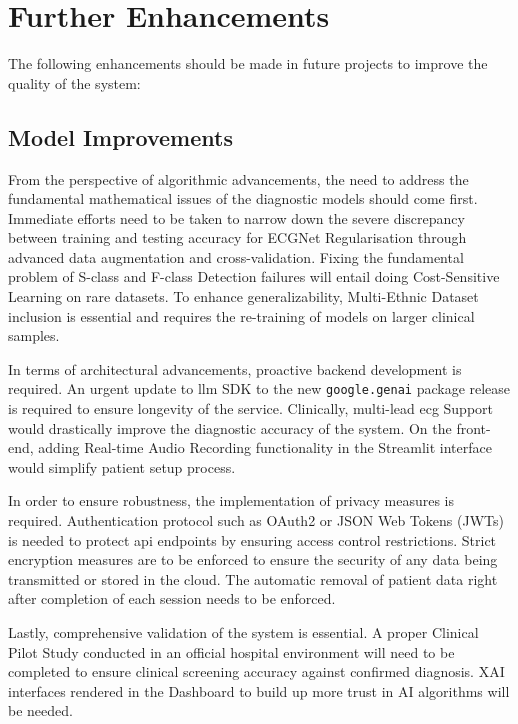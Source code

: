 \section{Further Enhancements}

The following enhancements should be made in future projects to improve the quality of the system:

\subsection{Model Improvements}

From the perspective of algorithmic advancements, the need to address the fundamental mathematical issues of the diagnostic models should come first. Immediate efforts need to be taken to narrow down the severe discrepancy between training and testing accuracy for ECGNet Regularisation through advanced data augmentation and cross-validation. Fixing the fundamental problem of S-class and F-class Detection failures will entail doing Cost-Sensitive Learning on rare datasets. To enhance generalizability, Multi-Ethnic Dataset inclusion is essential and requires the re-training of models on larger clinical samples.

In terms of architectural advancements, proactive backend development is required. An urgent update to \ac{llm} SDK to the new \texttt{google.genai} package release is required to ensure longevity of the service. Clinically, multi-lead \ac{ecg} Support would drastically improve the diagnostic accuracy of the system. On the front-end, adding Real-time Audio Recording functionality in the Streamlit interface would simplify patient setup process.

In order to ensure robustness, the implementation of privacy measures is required. Authentication protocol such as OAuth2 or JSON Web Tokens (JWTs) is needed to protect \ac{api} endpoints by ensuring access control restrictions. Strict encryption measures are to be enforced to ensure the security of any data being transmitted or stored in the cloud. The automatic removal of patient data right after completion of each session needs to be enforced.

Lastly, comprehensive validation of the system is essential. A proper Clinical Pilot Study conducted in an official hospital environment will need to be completed to ensure clinical screening accuracy against confirmed diagnosis. XAI interfaces rendered in the Dashboard to build up more trust in AI algorithms will be needed.
